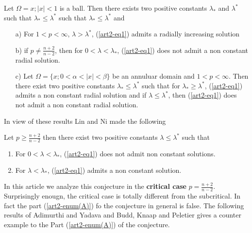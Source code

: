 \begin{theorem}\label{art2-thm2}
Let $\Omega = {x; |x| < 1 }$ is a ball. Then there exists two positive constants $\lambda_{*}$ and $\lambda^{*}$  such that 
$\lambda_{*} \leq \lambda^{*}$ such that $\lambda_{*} \leq \lambda^{*}$ and
\begin{itemize}
\item[a)]For $1< p < \infty$, $\lambda > \lambda^{*}$, (\ref{art2-eq1}) admits a radially increasing solution
\item[b)] if $p \neq \frac{n+2}{n-2}$, then for $0< \lambda <  \lambda_{*}$, (\ref{art2-eq1}) does not admit a non constant radial solution.
\item[c)] Let $\Omega = \{x; 0 < \alpha < |x| < \beta\}$ be an annuluar domain and $ 1 < p < \infty$. Then there exist two positive constants $\lambda_{*} \leq \lambda^{*}$ such that for $\lambda_{*} \geq \lambda^{*}$, (\ref{art2-eq1}) admits a non constant radial solution and if $\lambda \leq \lambda^{*}$, then (\ref{art2-eq1}) does not admit a non constant radial solution. 
\end{itemize}
\end{theorem} 

In view of these results Lin and Ni \cite{art2-key15} made the following

\begin{conjecture*}
Let $p \geq \frac{n+2}{n-2}$ then there exist two positive constants $\lambda \leq \lambda^{*}$ such that
\begin{enumerate}[\rm (A)]
\item For $0 < \lambda < \lambda_{*}$, (\ref{art2-eq1}) does not admit non constant solutions.\label{art2-enum(A)}
\item For $\lambda < \lambda_{*}$, (\ref{art2-eq1}) admits a non constant solution.\label{art2-enum(B)}
\end{enumerate}

 In this article we analyze this conjecture in the \textbf{critical case} $p = \frac{n+2}{n-2}$. Surprisingly enougn, the critical case is totally different from the subcritical. In fact the part (\ref{art2-enum(A)}) fo the conjecture in general is false. The following results of Adimurthi and Yadava \cite{art2-key4} and Budd, Knaap and Peletier \cite{art2-key12} gives a counter example to the Part (\ref{art2-enum(A)}) of the conjecture.
\end{conjecture*}

